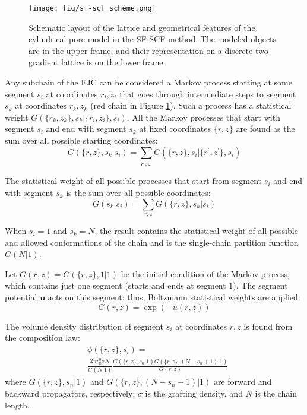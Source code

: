 \documentclass[10pt, a4paper]{article}
\begin{document}
\begin{multicols}{2}
\begin{figure}[H]
    \centering
    \texttt{[image: fig/sf-scf\_scheme.png]}
    \caption{
    Schematic layout of the lattice and geometrical features of the cylindrical pore model in the SF-SCF method.
    The modeled objects are in the upper frame, and their representation on a discrete two-gradient lattice is on the lower frame.
    }
\label{fig:sf-scf_scheme}
\end{figure}

Any subchain of the FJC can be considered a Markov process starting at some segment $s_i$ at coordinates $r_i, z_i$ that goes through intermediate steps to segment $s_k$ at coordinates $r_k, z_k$ (red chain in Figure \ref{fig:sf-scf_scheme}).
Such a process has a statistical weight $G(\{r_k, z_k\}, s_k | \{r_i, z_i\}, s_i)$.
All the Markov processes that start with segment $s_i$ and end with segment $s_k$ at fixed coordinates $\{r, z\}$ are found as the sum over all possible starting coordinates:
\begin{equation}
    \label{eq:sum_to_phi}
    G(\{r, z\}, s_k | s_i) = \sum_{r^{\prime}, z^{\prime}} G(\{r, z\}, s_i | \{r^{\prime}, z^{\prime}\}, s_i)
\end{equation}


The statistical weight of all possible processes that start from segment $s_i$ and end with segment $s_k$ is the sum over all possible coordinates:
\begin{equation}
    G(s_k | s_i) = \sum_{r, z} G(\{r, z\}, s_k | s_i)
\end{equation}

When $s_i=1$ and $s_k=N$, the result contains the statistical weight of all possible and allowed conformations of the chain and is the single-chain partition function $G(N|1)$.

Let $G(r, z) = G(\{r, z\}, 1|1)$ be the initial condition of the Markov process, which contains just one segment (starts and ends at segment $1$).
The segment potential $\mathbf{u}$ acts on this segment; thus, Boltzmann statistical weights are applied:
\begin{equation}
    G(r, z) = \exp(-u(r,z))
\end{equation}

The volume density distribution of segment $s_i$ at coordinates $r, z$ is found from the composition law:
\begin{equation}
    \label{eq:propagation}
    \begin{aligned}
        &\phi(\{r, z\}, s_i) = \\
        &\frac{2 \pi r_{\text{p}}^{0} \sigma N}{G(N|1)}
        \frac{G(\{r, z\}, s_n | 1) G(\{r, z\}, (N - s_n + 1) | 1)}{G(r, z)}
    \end{aligned}
\end{equation}
where $G(\{r, z\}, s_n | 1)$ and $G(\{r, z\}, (N - s_n + 1) | 1)$ are forward and backward propagators, respectively; $\sigma$ is the grafting density, and $N$ is the chain length.


\end{multicols}
\end{document}
